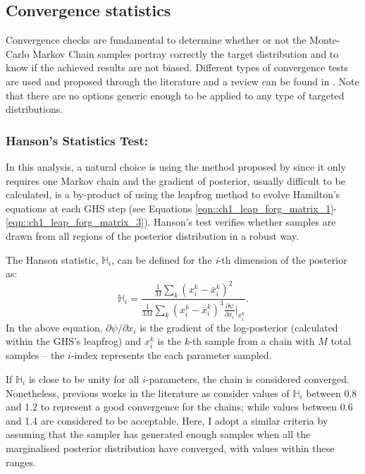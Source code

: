 \subsection{Convergence statistics}\label{Sec:BPL:Convergence}
Convergence checks are fundamental to determine whether or not the Monte-Carlo Markov Chain samples portray correctly the target distribution and to know if the achieved results are not biased. Different types of convergence tests are used and proposed through the literature and a review can be found in \cite{2017Deonovic}. Note that there are no options generic enough to be applied to any type of targeted distributions.

\subsubsection{Hanson's Statistics Test:}
In this analysis, a natural choice is using the method proposed by \cite{Hanson2001} since it only requires one Markov chain and the gradient of posterior, usually difficult to be calculated, is a by-product of using the leapfrog method to evolve Hamilton's equations at each GHS step (see Equations \eqref{eqn::ch1_leap_forg_matrix_1}-\eqref{eqn::ch1_leap_forg_matrix_3}). Hanson's test verifies whether samples are drawn from all regions of the posterior distribution in a robust way. 

\qquad The Hanson statistic, $\mathbb{H}_i$, can be defined for the \textit{i}-th dimension of the posterior as:
\begin{equation}
 \mathbb{H}_i=\frac{\frac{1}{M}\sum_k\left(x_i^k-\bar{x}_i^k\right)^2}{ \frac{1}{3M}\sum_k\left(x_i^k-\bar{x}_i^k\right)^3\frac{\partial\psi}{\partial x_i}\Big|_{x_i^k} }.
 \end{equation}
In the above equation, $\partial\psi/\partial x_i$ is the gradient of the log-posterior (calculated within the GHS's leapfrog) and $x_i^k$ is the \textit{k}-th sample from a chain with $M$ total samples -- the $i$-index represents the each parameter sampled.

\qquad If $\mathbb{H}_i$ is close to be unity for all $i$-parameters, the chain is considered converged. Nonetheless, previous works in the literature as \cite{Taylor2008} consider values of $\mathbb{H}_i$ between 0.8 and 1.2 to represent a good convergence for the chains; while values between 0.6 and 1.4 are considered to be acceptable. Here, I adopt a similar criteria by assuming that the sampler has generated enough samples when all the marginalised posterior distribution have converged, with values within these ranges.

